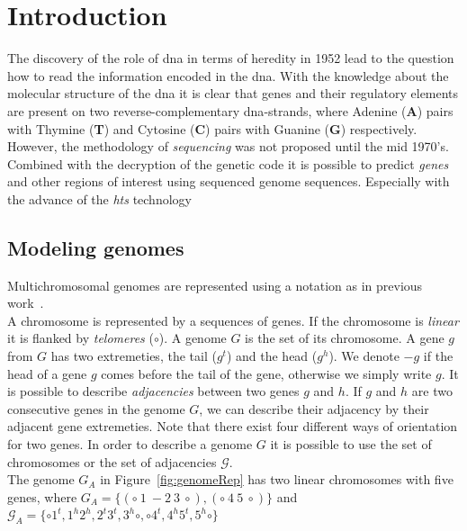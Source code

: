 \chapter{Introduction}

The discovery of the role of \gls{dna} in terms of heredity in 1952 lead to the question how to read the information encoded in the \gls{dna}.
With the knowledge about the molecular structure of the \gls{dna} it is clear that genes and their regulatory elements are present on two 
reverse-complementary \gls{dna}-strands, where Adenine (\textbf{A}) pairs with Thymine (\textbf{T}) and Cytosine (\textbf{C}) 
pairs with Guanine (\textbf{G}) respectively.
However, the methodology of \emph{sequencing} was not proposed until the mid 1970's.
Combined with the decryption of the genetic code it is possible to predict \emph{genes} and other regions of interest using sequenced genome sequences.
Especially with the advance of the \emph{\gls{hts}} technology  

\section{Modeling genomes} %
\label{sub:modeling_genomes}

Multichromosomal genomes are represented using a notation as in previous work~\cite{Bergeron2006}.\\
A chromosome is represented by a sequences of genes.
If the chromosome is \emph{linear} it is flanked by \emph{telomeres} ($\circ$).
A genome $G$ is the set of its chromosome.
A gene $g$ from $G$ has two extremeties, the tail ($g^t$) and the head ($g^h$).
We denote $-g$ if the head of a gene $g$ comes before the tail of the gene, otherwise we simply write $g$.
It is possible to describe \emph{adjacencies} between two genes $g$ and $h$. 
If $g$ and $h$ are two consecutive genes in the genome $G$, we can describe their adjacency by their adjacent gene extremeties.
Note that there exist four different ways of orientation for two genes.
In order to describe a genome $G$ it is possible to use the set of chromosomes or the set of adjacencies $\mathcal{G}$.\\
The genome $G_A$ in Figure~\ref{fig:genomeRep} has two linear chromosomes with five genes, where $G_A=\{(\circ\ 1\ -2\ 3\ \circ),(\circ\ 4\ 5\ \circ)\}$
and $\mathcal{G}_A=\{\circ 1^t, 1^h2^h, 2^t3^t, 3^h\circ, \circ 4^t, 4^h5^t, 5^h\circ\}$\\ \ \\

